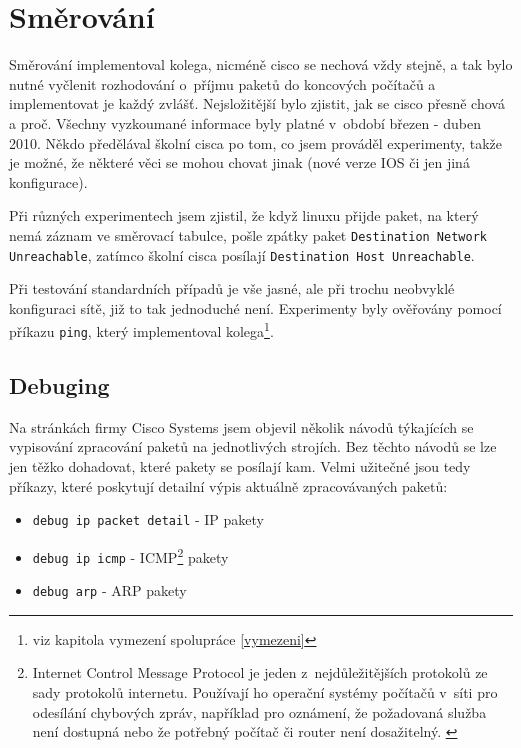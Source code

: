 \section{Směrování} \label{prijmiEthernetove}
Směrování implementoval kolega, nicméně cisco se nechová vždy stejně, a tak bylo nutné vyčlenit rozhodování o~příjmu paketů do koncových počítačů a implementovat je každý zvlášť. Nejsložitější bylo zjistit, jak se cisco přesně chová a proč. Všechny vyzkoumané informace byly platné v~období březen - duben 2010. Někdo předělával školní cisca po tom, co jsem prováděl experimenty, takže je možné, že některé věci se mohou chovat jinak (nové verze IOS či jen jiná konfigurace). 

Při různých experimentech jsem zjistil, že když linuxu přijde paket, na který nemá záznam ve směrovací tabulce, pošle zpátky paket \verb|Destination Network Unreachable|, zatímco školní cisca posílají \verb|Destination Host Unreachable|.

Při testování standardních případů je vše jasné, ale při trochu neobvyklé konfiguraci sítě, již to tak jednoduché není. Experimenty byly ověřovány pomocí příkazu \verb|ping|, který implementoval kolega\footnote{viz kapitola vymezení spolupráce \ref{vymezeni}}. 


\subsection{Debuging}
Na stránkách firmy Cisco Systems jsem objevil několik návodů týkajících se vypisování zpracování paketů na jednotlivých strojích. Bez těchto návodů se lze jen těžko dohadovat, které pakety se posílají kam. Velmi užitečné jsou tedy příkazy, které poskytují detailní výpis aktuálně zpracovávaných paketů:

\begin{itemize}
 \item \verb|debug ip packet detail| - IP pakety 
 \item \verb|debug ip icmp| - ICMP\footnote{Internet Control Message Protocol je jeden z~nejdůležitějších protokolů ze sady protokolů internetu. Používají ho operační systémy počítačů v~síti pro odesílání chybových zpráv, například pro oznámení, že požadovaná služba není dostupná nebo že potřebný počítač či router není dosažitelný. \cite{wiki:icmp}} pakety
 \item \verb|debug arp| - ARP pakety
\end{itemize}

